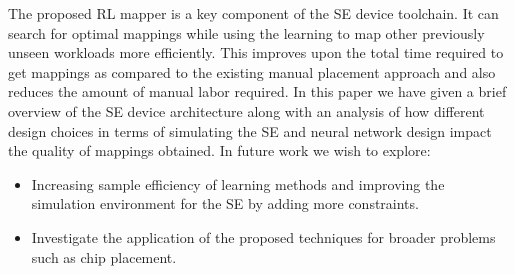 The proposed RL mapper is a key component of the SE device toolchain.
It can search for optimal mappings while using the learning to map other previously unseen workloads more efficiently.
This improves upon the total time required to get mappings as compared to the existing manual placement approach and also reduces the amount of manual labor required.
In this paper we have given a brief overview of the SE device architecture along with an analysis of how different design choices in terms of simulating the SE and neural network design impact the quality of mappings obtained.
In future work we wish to explore:

\begin{itemize}
    \item Increasing sample efficiency of learning methods and improving the simulation environment for the SE by adding more constraints. 
    \item Investigate the application of the proposed techniques for broader problems such as chip placement.
\end{itemize}